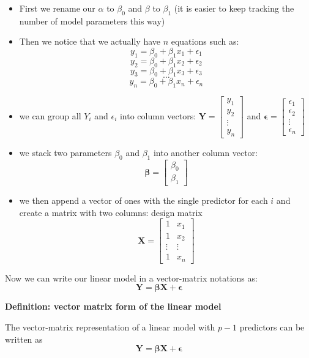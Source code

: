 \documentclass[
]{book}
\providecommand{\tightlist}{%
  \setlength{\itemsep}{0pt}\setlength{\parskip}{0pt}}
\theoremstyle{definition}
\theoremstyle{definition}
\theoremstyle{definition}
\theoremstyle{remark}
\begin{document}
\begin{itemize}
\tightlist
\item
  First we rename our \(\alpha\) to \(\beta_0\) and \(\beta\) to \(\beta_1\) (it is easier to keep tracking the number of model parameters this way)
\item
  Then we notice that we actually have \(n\) equations such as:
  \[y_1 = \beta_0 + \beta_1 x_1 + \epsilon_1\]
  \[y_2 = \beta_0 + \beta_1 x_2 + \epsilon_2\]
  \[y_3 = \beta_0 + \beta_1 x_3 + \epsilon_3\]
  \[\dots\]
  \[y_n = \beta_0 + \beta_1 x_n + \epsilon_n\]
\item
  we can group all \(Y_i\) and \(\epsilon_i\) into column vectors:
  \(\mathbf{Y}=\begin{bmatrix} y_1 \\ y_2 \\ \vdots \\ y_{n} \end{bmatrix}\) and
  \(\boldsymbol\epsilon=\begin{bmatrix} \epsilon_1 \\ \epsilon_2 \\ \vdots \\ \epsilon_{n} \end{bmatrix}\)
\item
  we stack two parameters \(\beta_0\) and \(\beta_1\) into another column vector:\[\boldsymbol\beta=\begin{bmatrix}
  \beta_0  \\
  \beta_1
  \end{bmatrix}\]
\item
  we then append a vector of ones with the single predictor for each \(i\) and create a matrix with two columns:
  design matrix \[\mathbf{X}=\begin{bmatrix}
  1 & x_1  \\
  1 & x_2  \\
  \vdots & \vdots \\
  1 & x_{n}
  \end{bmatrix}\]
\end{itemize}

Now we can write our linear model in a vector-matrix notations as:
\[\mathbf{Y} = \boldsymbol\beta\mathbf{X} + \boldsymbol\epsilon\]

\textbf{Definition: vector matrix form of the linear model}

The vector-matrix representation of a linear model with \(p-1\) predictors can be written as
\[\mathbf{Y} = \boldsymbol\beta\mathbf{X} + \boldsymbol\epsilon\]
\end{document}
